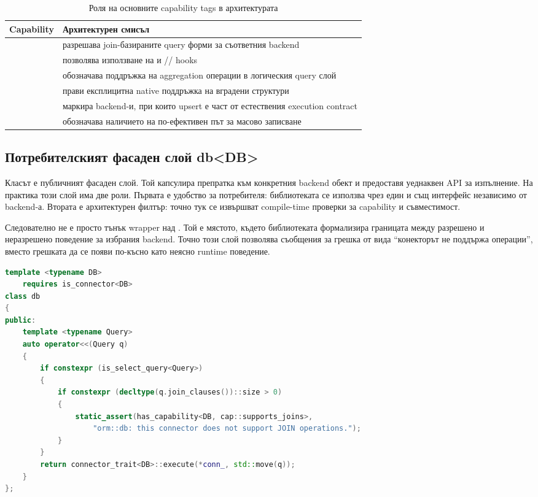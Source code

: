 \begin{table}[H]
\centering
\small
\caption{Роля на основните capability tags в архитектурата}
\label{tab:capability_tags}
\begin{tabularx}{\textwidth}{L{3.6cm}Y}
\toprule
\textbf{Capability} & \textbf{Архитектурен смисъл} \\
\midrule
{} & разрешава join-базираните query форми за съответния backend \\
 & позволява използване на  и // hooks \\
 & обозначава поддръжка на aggregation операции в логическия query слой \\
 & прави експлицитна native поддръжка на вградени структури \\
 & маркира backend-и, при които upsert е част от естествения execution contract \\
 & обозначава наличието на по-ефективен път за масово записване \\
\bottomrule
\end{tabularx}
\end{table}

\subsection{Потребителският фасаден слой db<DB>}

Класът  е публичният фасаден слой. Той капсулира препратка към конкретния backend обект и предоставя уеднаквен API за изпълнение. На практика този слой има две роли. Първата е удобство за потребителя: библиотеката се използва чрез един и същ интерфейс независимо от backend-а. Втората е архитектурен филтър: точно тук се извършват compile-time проверки за capability и съвместимост.

Следователно  не е просто тънък wrapper над . Той е мястото, където библиотеката формализира границата между разрешено и неразрешено поведение за избрания backend. Точно този слой позволява съобщения за грешка от вида ``конекторът не поддържа  операции'', вместо грешката да се появи по-късно като неясно runtime поведение.

\begin{lstlisting}[language=C++,caption={Извадка от фасадния слой \code{db<DB>}},label={lst:db_facade}]
template <typename DB>
    requires is_connector<DB>
class db
{
public:
    template <typename Query>
    auto operator<<(Query q)
    {
        if constexpr (is_select_query<Query>)
        {
            if constexpr (decltype(q.join_clauses())::size > 0)
            {
                static_assert(has_capability<DB, cap::supports_joins>,
                    "orm::db: this connector does not support JOIN operations.");
            }
        }
        return connector_trait<DB>::execute(*conn_, std::move(q));
    }
};
\end{lstlisting}

